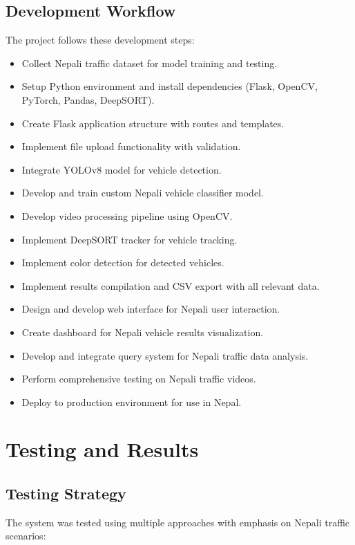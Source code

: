\documentclass[12pt,a4paper]{report}
\begin{document}
\section{Development Workflow}
The project follows these development steps:
\begin{itemize}
    \item Collect Nepali traffic dataset for model training and testing.
    \item Setup Python environment and install dependencies (Flask, OpenCV, PyTorch, Pandas, DeepSORT).
    \item Create Flask application structure with routes and templates.
    \item Implement file upload functionality with validation.
    \item Integrate YOLOv8 model for vehicle detection.
    \item Develop and train custom Nepali vehicle classifier model.
    \item Develop video processing pipeline using OpenCV.
    \item Implement DeepSORT tracker for vehicle tracking.
    \item Implement color detection for detected vehicles.
    \item Implement results compilation and CSV export with all relevant data.
    \item Design and develop web interface for Nepali user interaction.
    \item Create dashboard for Nepali vehicle results visualization.
    \item Develop and integrate query system for Nepali traffic data analysis.
    \item Perform comprehensive testing on Nepali traffic videos.
    \item Deploy to production environment for use in Nepal.
\end{itemize}


\chapter{Testing and Results}

\section{Testing Strategy}
The system was tested using multiple approaches with emphasis on Nepali traffic scenarios:
\end{document}
